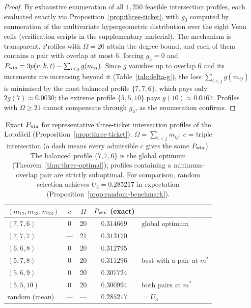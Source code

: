 \begin{proof}
  By exhaustive enumeration of all $1{,}250$ feasible intersection
  profiles, each evaluated exactly via
  Proposition~\ref{prop:three-ticket}, with $g_3$ computed by enumeration
  of the multivariate hypergeometric distribution over the eight Venn
  cells (verification scripts in the supplementary material).  The
  mechanism is transparent.  Profiles with $\Omega = 20$ attain the
  degree bound, and each of them contains a pair with overlap at most
  $6$, forcing $g_3 = 0$ and
  $P_{\mathrm{win}} = 3p(v,k,t) - \sum_{i<j} g(m_{ij})$.  Since $g$ vanishes up to
  overlap $6$ and its increments are increasing beyond it
  (Table~\ref{tab:delta-g}), the loss $\sum_{i<j} g(m_{ij})$ is minimised
  by the most balanced profile $\{7,7,6\}$, which pays only $2g(7)
  \approx 0.0030$; the extreme profile $\{5,5,10\}$ pays $g(10) \approx
  0.0167$.  Profiles with $\Omega \ge 21$ cannot compensate through
  $g_3$, as the enumeration confirms.
\end{proof}

\begin{table}[ht]
  \centering
  \caption{Exact $P_{\mathrm{win}}$ for representative three-ticket intersection
    profiles of the Lotofácil (Proposition~\ref{prop:three-ticket}).
    $\Omega = \sum_{i<j} m_{ij}$; $c$ = triple intersection (a dash means
    every admissible $c$ gives the same $P_{\mathrm{win}}$).  The balanced profile
    $\{7,7,6\}$ is the global optimum
    (Theorem~\ref{thm:three-optimal}); profiles containing a
    minimum-overlap pair are strictly suboptimal.  For comparison, random
    selection achieves $U_3 = 0.285217$ in expectation
    (Proposition~\ref{prop:random-benchmark}).}
  \label{tab:three-profiles}
  \smallskip
  \begin{tabular}{@{}lccc l@{}}
    \toprule
    $(m_{12},m_{13},m_{23})$ & $c$ & $\Omega$ & $P_{\mathrm{win}}$ (exact) & \\
    \midrule
    $(7,7,6)$   & 0   & 20 & $0.314669$ & global optimum \\
    $(7,7,7)$   & --- & 21 & $0.313170$ & \\
    $(6,6,8)$   & 0   & 20 & $0.312795$ & \\
    $(5,7,8)$   & 0   & 20 & $0.311296$ & best with a pair at $m^*$ \\
    $(5,6,9)$   & 0   & 20 & $0.307724$ & \\
    $(5,5,10)$  & 0   & 20 & $0.300994$ & both pairs at $m^*$ \\
    \midrule
    random (mean) & --- & --- & $0.285217$ & $= U_3$ \\
    \bottomrule
  \end{tabular}
\end{table}

